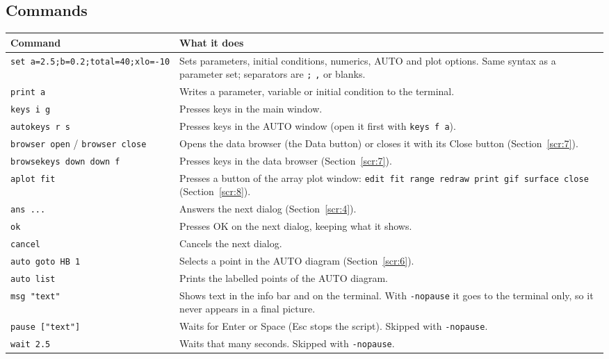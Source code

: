 \documentclass{article}
\begin{document}
\subsection{Commands}\label{scr:3}

\begin{longtable}[]{@{}p{}p{}@{}}
\toprule\noalign{}
Command & What it does \\
\midrule\noalign{}
\endhead
\bottomrule\noalign{}
\endlastfoot
\texttt{set\ a=2.5;b=0.2;total=40;xlo=-10} & Sets parameters, initial conditions, numerics, AUTO and plot
options. Same syntax as a parameter set; separators are \texttt{;}
\texttt{,} or blanks. \\
\texttt{print\ a} & Writes a parameter, variable or initial condition to the
terminal. \\
\texttt{keys\ i\ g} & Presses keys in the main window. \\
\texttt{autokeys\ r\ s} & Presses keys in the AUTO window (open it first with
\texttt{keys\ f\ a}). \\
\texttt{browser\ open} / \texttt{browser\ close} & Opens the data browser (the Data button) or closes it with its Close
button (Section~\ref{scr:7}). \\
\texttt{browsekeys\ down\ down\ f} & Presses keys in the data browser (Section~\ref{scr:7}). \\
\texttt{aplot\ fit} & Presses a button of the array plot window: \texttt{edit\ fit\ range\ redraw\ print\ gif\ surface\ close} (Section~\ref{scr:8}). \\
\texttt{ans\ ...} & Answers the next dialog (Section~\ref{scr:4}). \\
\texttt{ok} & Presses OK on the next dialog, keeping what it shows. \\
\texttt{cancel} & Cancels the next dialog. \\
\texttt{auto\ goto\ HB\ 1} & Selects a point in the AUTO diagram (Section~\ref{scr:6}). \\
\texttt{auto\ list} & Prints the labelled points of the AUTO diagram. \\
\texttt{msg\ "text"} & Shows text in the info bar and on the terminal. With
\texttt{-nopause} it goes to the terminal only, so it never appears
in a final picture. \\
\texttt{pause\ {[}"text"{]}} & Waits for Enter or Space (Esc stops the script). Skipped with
\texttt{-nopause}. \\
\texttt{wait\ 2.5} & Waits that many seconds. Skipped with \texttt{-nopause}. \\

\end{longtable}
\end{document}

